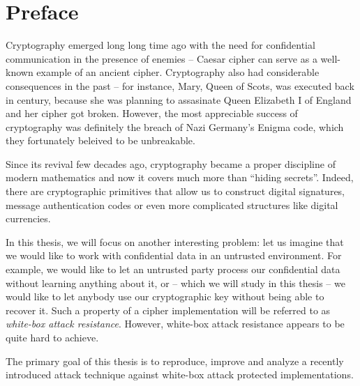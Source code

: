 \cleardoublepage{}

\chapter*{Preface}


Cryptography emerged long long time ago with the need for confidential communication in the presence of enemies -- Caesar cipher can serve as a well-known example of an ancient cipher. Cryptography also had considerable consequences in the past -- for instance, Mary, Queen of Scots, was executed back in  century, because she was planning to assasinate Queen Elizabeth I of England and her cipher got broken. However, the most appreciable success of cryptography was definitely the breach of Nazi Germany's Enigma code, which they fortunately beleived to be unbreakable.

Since its revival few decades ago, cryptography became a proper discipline of modern mathematics and now it covers much more than ``hiding secrets''. Indeed, there are cryptographic primitives that allow us to construct digital signatures, message authentication codes or even more complicated structures like digital currencies.

In this thesis, we will focus on another interesting problem: let us imagine that we would like to work with confidential data in an untrusted environment. For example, we would like to let an untrusted party process our confidential data without learning anything about it, or -- which we will study in this thesis -- we would like to let anybody use our cryptographic key without being able to recover it. Such a property of a cipher implementation will be referred to as {\em white-box attack resistance}. However, white-box attack resistance appears to be quite hard to achieve.

The primary goal of this thesis is to reproduce, improve and analyze a recently introduced attack technique \cite{bos2015differential} against white-box attack protected implementations.



